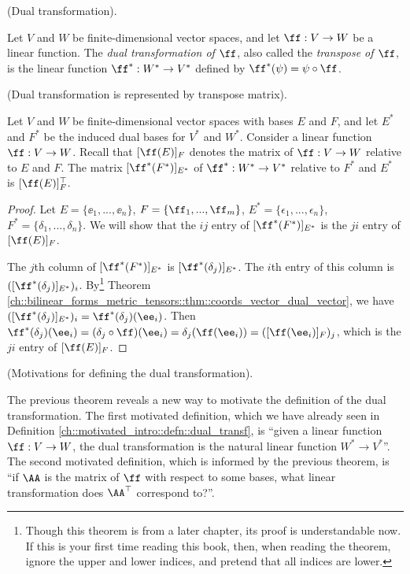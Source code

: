 \begin{defn}
\label{ch::motivated_intro::defn::dual_transf}
    (Dual transformation).
    
    Let $V$ and $W$ be finite-dimensional vector spaces, and let $\ff:V \rightarrow W$ be a linear function.
    The \textit{dual transformation of $\ff$}, also called the \textit{transpose of $\ff$}, is the linear function $\ff^*:W^* \rightarrow V^*$ defined by $\ff^*(\psi) = \psi \circ \ff$.
\end{defn}

\begin{theorem}
    (Dual transformation is represented by transpose matrix).

    Let $V$ and $W$ be finite-dimensional vector spaces with bases $E$ and $F$, and let $E^*$ and $F^*$ be the induced dual bases for $V^*$ and $W^*$. Consider a linear function $\ff:V \rightarrow W$. Recall that $[\ff(E)]_F$ denotes the matrix of $\ff:V \rightarrow W$ relative to $E$ and $F$. The matrix $[\ff^*(F^*)]_{E^*}$ of $\ff^*:W^* \rightarrow V^*$ relative to $F^*$ and $E^*$ is $[\ff(E)]_F^{\top}$.
\end{theorem}

\begin{proof}
    Let $E = \{\ee_1, ..., \ee_n\}$, $F = \{\ff_1, ..., \ff_m\}$, $E^* = \{\epsilon_1, ..., \epsilon_n\}$, $F^* = \{\delta_1, ..., \delta_n\}$. We will show that the $ij$ entry of $[\ff^*(F^*)]_{E^*}$ is the $ji$ entry of $[\ff(E)]_F$.
    
    The $j$th column of $[\ff^*(F^*)]_{E^*}$ is $[\ff^*(\delta_j)]_{E^*}$. The $i$th entry of this column is $([\ff^*(\delta_j)]_{E^*})_i$. By\footnote{Though this theorem is from a later chapter, its proof is understandable now. If this is your first time reading this book, then, when reading the theorem, ignore the upper and lower indices, and pretend that all indices are lower.} Theorem \ref{ch::bilinear_forms_metric_tensors::thm::coords_vector_dual_vector}, we have $([\ff^*(\delta_j)]_{E^*})_i = \ff^*(\delta_j)(\ee_i)$. Then $\ff^*(\delta_j)(\ee_i) = (\delta_j \circ \ff)(\ee_i) = \delta_j(\ff(\ee_i)) = ([\ff(\ee_i)]_F)_j$, which is the $ji$ entry of $[\ff(E)]_F$.
\end{proof}

\begin{remark}
    (Motivations for defining the dual transformation).
    
    The previous theorem reveals a new way to motivate the definition of the dual transformation. The first motivated definition, which we have already seen in Definition \ref{ch::motivated_intro::defn::dual_transf}, is ``given a linear function $\ff:V \rightarrow W$, the dual transformation is the natural linear function $W^* \rightarrow V^*$''. The second motivated definition, which is informed by the previous theorem, is ``if $\AA$ is the matrix of $\ff$ with respect to some bases, what linear transformation does $\AA^\top$ correspond to?''.
\end{remark}

